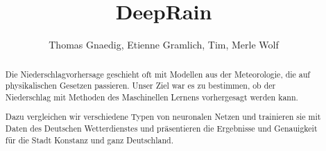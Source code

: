 \documentclass[11pt,a4paper]{article}
\title{DeepRain}
\author{Thomas Gnaedig, Etienne Gramlich, Tim, Merle Wolf}
\begin{document}
\maketitle
\tableofcontents

\begin{abstract}
Die Niederschlagvorhersage geschieht oft mit Modellen aus der Meteorologie, die auf physikalischen Gesetzen passieren. Unser Ziel war es zu bestimmen, ob der Niederschlag mit Methoden des Maschinellen Lernens vorhergesagt werden kann.

Dazu vergleichen wir verschiedene Typen von neuronalen Netzen und trainieren sie mit Daten des Deutschen Wetterdienstes und präsentieren die Ergebnisse und Genauigkeit für die Stadt Konstanz und ganz Deutschland.
\end{abstract}










\newpage
\listoffigures
\listoftables
\end{document}
